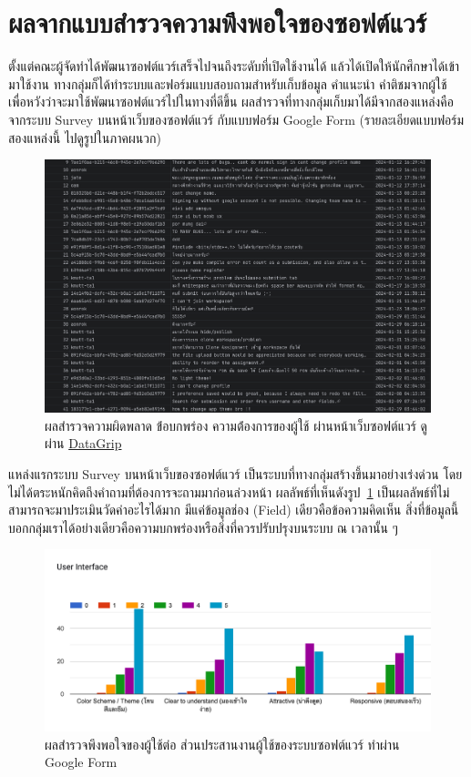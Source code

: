 \documentclass[12pt,one side,openright,a4paper]{cpe-thesis-th}
\newcommand{\thaijustify}[1]{%
  \par\hspace{30pt}\justifying
  #1
}
\begin{document}
\section{ผลจากแบบสำรวจความพึงพอใจของซอฟต์แวร์}
    \thaijustify{
        ตั้งแต่คณะผู้จัดทำได้พัฒนาซอฟต์แวร์เสร็จไปจนถึงระดับที่เปิดใช้งานได้ แล้วได้เปิดให้นักศึกษาได้เข้ามาใช้งาน ทางกลุ่มก็ได้ทำระบบและฟอร์มแบบสอบถามสำหรับเก็บข้อมูล คำแนะนำ คำติชมจากผู้ใช้ เพื่อหวังว่าจะมาใช้พัฒนาซอฟต์แวร์ไปในทางที่ดีขึ้น ผลสำรวจที่ทางกลุ่มเก็บมาได้มีจากสองแหล่งคือจากระบบ Survey บนหน้าเว็บของซอฟต์แวร์ กับแบบฟอร์ม Google Form (รายละเอียดแบบฟอร์มสองแหล่งนี้ ไปดูรูปในภาคผนวก)
    }
    \begin{figure}[H]
        \centering
        \includegraphics[width=12cm]{figure/results/survey/survey-beta-db.png}
        \caption[ผลสำรวจความผิดพลาด ข้่อบกพร่อง ความต้่องการของผู้ใช้]{ผลสำรวจความผิดพลาด ข้่อบกพร่อง ความต้่องการของผู้ใช้ ผ่านหน้าเว็บซอฟต์แวร์ ดูผ่าน \href{https://www.jetbrains.com/datagrip/}{DataGrip}}
        \label{fig:res-survey-beta-db}
    \end{figure}
    \thaijustify{
        แหล่งแรกระบบ Survey บนหน้าเว็บของซอฟต์แวร์ เป็นระบบที่ทางกลุ่มสร้างขึ้นมาอย่างเร่งด่วน โดยไม่ได้ตระหนักคิดถึงคำถามที่ต้องการจะถามมาก่อนล่วงหน้า ผลลัพธ์ที่เห็นดังรูป~\ref{fig:res-survey-beta-db} เป็นผลลัพธ์ที่ไม่สามารถจะมาประเมินวัดค่าอะไรได้มาก มีแค่ข้อมูลช่อง (Field) เดียวคือข้อความคิดเห็น สิ่งที่ข้อมูลนี้บอกกลุ่มเราได้อย่างเดียวคือความบกพร่องหรือสิ่งที่ควรปรับปรุงบนระบบ ณ เวลานั้น ๆ
    }
    \begin{figure}[H]
        \centering
        \includegraphics[width=12cm]{figure/results/survey/survey-ui-score.png}
        \caption[ผลสำรวจพึงพอใจของผู้ใช้ต่อส่วนประสานงานผู้ใช้ของระบบซอฟต์แวร์]{ผลสำรวจพึงพอใจของผู้ใช้ต่อ ส่วนประสานงานผู้ใช้ของระบบซอฟต์แวร์ ทำผ่าน Google Form}
        \label{fig:res-survey-ui}
    \end{figure}
\end{document}
